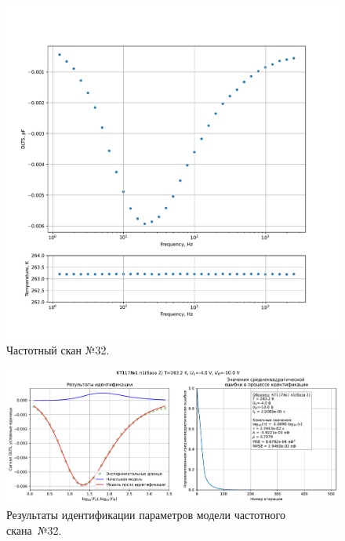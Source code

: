 \begin{figure}[!ht]
    \centering
    \includegraphics[width=1\textwidth]{../plots/КТ117№1_п1(база 2)_2500Гц-1Гц_1пФ_-10С_-4В-10В_100мВ_20мкс_шаг_0,1.pdf}
    \caption{Частотный скан №32.}
    \label{pic:frequency_scan_32}
\end{figure}

\begin{figure}[!ht]
    \centering
    \includegraphics[width=1\textwidth]{../plots/КТ117№1_п1(база 2)_2500Гц-1Гц_1пФ_-10С_-4В-10В_100мВ_20мкс_шаг_0,1_model.pdf}
    \caption{Результаты идентификации параметров модели частотного скана~№32.}
    \label{pic:frequency_scan_model32}
\end{figure}

\pagebreak


